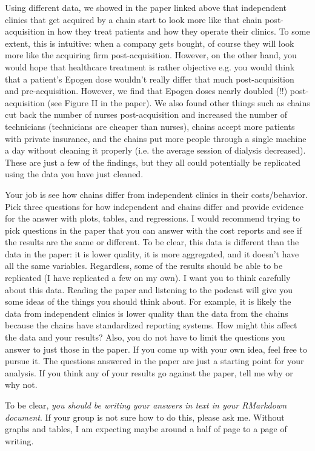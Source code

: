 \documentclass{article}
\begin{document}
	Using different data, we showed in the paper linked above that independent clinics that get acquired by a chain start to look more like that chain post-acquisition in how they treat patients and how they operate their clinics. To some extent, this is intuitive: when a company gets bought, of course they will look more like the acquiring firm post-acquisition. However, on the other hand, you would hope that healthcare treatment is rather objective e.g. you would think that a patient's Epogen dose wouldn't really differ that much post-acquisition and pre-acquisition. However, we find that Epogen doses nearly doubled (!!) post-acquisition (see Figure II in the paper). We also found other things such as chains cut back the number of nurses post-acquisition and increased the number of technicians (technicians are cheaper than nurses), chains accept more patients with private insurance, and the chains put more people through a single machine a day without cleaning it properly (i.e. the average session of dialysis decreased). These are just a few of the findings, but they all could potentially be replicated using the data you have just cleaned.
	
	Your job is see how chains differ from independent clinics in their costs/behavior. Pick three questions for how independent and chains differ and provide evidence for the answer with plots, tables, and regressions. I would recommend trying to pick questions in the paper that you can answer with the cost reports and see if the results are the same or different. To be clear, this data is different than the data in the paper: it is lower quality, it is more aggregated, and it doesn't have all the same variables. Regardless, some of the results should be able to be replicated (I have replicated a few on my own). I want you to think carefully about this data. Reading the paper and listening to the podcast will give you some ideas of the things you should think about. For example, it is likely the data from independent clinics is lower quality than the data from the chains because the chains have standardized reporting systems. How might this affect the data and your results? Also, you do not have to limit the questions you answer to just those in the paper. If you come up with your own idea, feel free to pursue it. The questions answered in the paper are just a starting point for your analysis. If you think any of your results go against the paper, tell me why or why not.
	
	To be clear, \textit{you should be writing your answers in text in your RMarkdown document}. If your group is not sure how to do this, please ask me. Without graphs and tables, I am expecting maybe around a half of page to a page of writing. 
	
\end{document}
